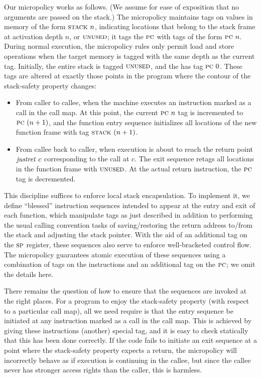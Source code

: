 \documentclass[acmsmall,review,anonymous]{acmart}\settopmatter{printfolios=true,printccs=false,printacmref=false}
\begin{document}
Our micropolicy works as follows. (We assume for ease of exposition that no
arguments are passed on the stack.)
The micropolicy maintains tags on values in memory of the form $\textsc{stack} ~ n$,
indicating locations that belong to the stack frame at activation depth $n$,
or $\textsc{unused}$; it tags the $\textsc{pc}$ with tags of the form $\textsc{pc} ~ n$.
During normal execution, the micropolicy rules only permit load and store operations
when the target memory is tagged with the same depth as the current {\PCname} tag.
Initially, the entire stack is tagged $\textsc{unused}$,
and the {\PCname} has tag $\textsc{pc} ~ 0$. These tags are altered
at exactly those points in
the program where the contour of the stack-safety property changes:

\begin{itemize}

\item From caller to callee, when the machine executes an instruction marked as a call in
  the call map.
  At this point, the current
  $\textsc{pc} ~ n$ tag is incremented to $\textsc{pc} ~ (n + 1)$, and the function
  entry sequence initializes  all locations of the new function frame with
  tag $\textsc{stack} ~ (n + 1)$.

\item From callee back to caller, when execution is about to reach the return point
  $\mathit{justret}\ c$
  corresponding to the call at $c$.  The exit sequence retags all locations in the function
  frame with $\textsc{unused}$. At the actual return instruction, the
  $\textsc{pc}$ tag is decremented.

\end{itemize}

This discipline suffices to enforce local stack encapsulation.
To implement it,  we define ``blessed'' instruction sequences
intended to appear at the entry and exit of each function,
which manipulate tags as just described in addition to performing the
usual calling convention tasks of saving/restoring the return address to/from
the stack and adjusting the stack pointer. With the aid of an additional tag on
the $\textsc{sp}$ register, these sequences also serve to enforce
well-bracketed control flow.
The micropolicy guarantees atomic execution of these sequences
using a combination of tags on the instructions
and an additional tag on the $\textsc{pc}$; we omit the details here.

There remains the question of how to ensure that the sequences are
invoked at the right places. For a program to enjoy the stack-safety property
(with respect to a particular call map), all we need require is that
the entry sequence be initiated at any instruction marked as a call
in the call map. This is achieved by giving these instructions (another) special tag,
and it is easy to check statically that this has been done correctly.
If the code fails to initiate an exit
sequence at a point where the stack-safety property expects a return,
the micropolicy will incorrectly behave as if execution
is continuing in the callee, but since the callee never has stronger access
rights than the caller, this is harmless.
\end{document}
